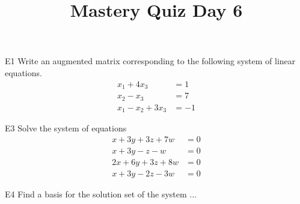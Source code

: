 \documentclass{sbgLAquiz}
\title{Mastery Quiz Day 6 }
\begin{document}
\begin{problem}{E1}
Write an augmented matrix corresponding to the following system of linear equations.
\begin{align*}
x_1+4x_3 &= 1 \\
x_2-x_3 &= 7 \\
x_1-x_2+3x_3 &= -1
\end{align*}
\end{problem}

\begin{problem}{E3}
Solve the system of equations
\begin{align*}
x+3y+3z+7w &= 0 \\
 x+3y-z-w &= 0 \\
  2x+6y+3z+8w &= 0 \\
   x+3y-2z-3w &= 0
\end{align*}
\end{problem}
\newpage

\begin{problem}{E4}
Find a basis for the solution set of the system ...
\end{problem}
\end{document}
